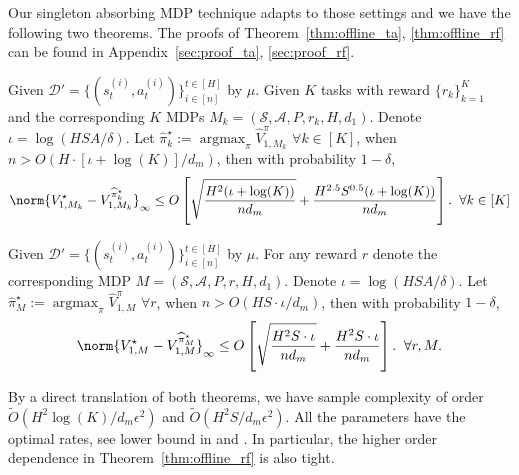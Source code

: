 Our singleton absorbing MDP technique adapts to those settings and we have the following two theorems. The proofs of Theorem~\ref{thm:offline_ta}, \ref{thm:offline_rf} can be found in Appendix~\ref{sec:proof_ta}, \ref{sec:proof_rf}.
\vspace{1em}
 \begin{theorem}\label{thm:offline_ta}
 	Given $\mathcal{D}'=\{(s_{t}^{(i)}, a_{t}^{(i)})\}_{i \in[n]}^{t \in[H]}$ by $\mu$. Given $K$ tasks with reward $\{r_k\}_{k=1}^K$ and the corresponding $K$ MDPs $M_k=(\mathcal{S}, \mathcal{A}, P, r_k, H, d_1)$. Denote $\iota=\log(HSA/\delta)$. Let $\widehat{\pi}_k^{\star}:=\operatorname{argmax}_{\pi} \widehat{V}_{1,M_k}^{\pi}$ $\forall k\in[K]$, when $n>O(H\cdot[\iota+\log(K)]/d_m)$, then with probability $1-\delta$,
 	\[
 	\norm{V_{1,M_k}^\star-V_{1,M_k}^{\widehat{\pi}_k^{\star}}}_\infty\leq 
 	O\left[\sqrt{\frac{H^2 (\iota+\log(K))}{n d_m}}+\frac{H^{2.5}S^{0.5}(\iota+\log(K))}{nd_m}\right].
 	\;\;\forall k\in[K]
 	\]
 \end{theorem}

\begin{theorem}\label{thm:offline_rf}
	Given $\mathcal{D}'=\{(s_{t}^{(i)}, a_{t}^{(i)})\}_{i \in[n]}^{t \in[H]}$ by $\mu$. For any reward $r$ denote the corresponding MDP $M=(\mathcal{S}, \mathcal{A}, P, r, H, d_1)$. Denote $\iota=\log(HSA/\delta)$. Let $\widehat{\pi}^{\star}_M:=\operatorname{argmax}_{\pi} \widehat{V}_{1,M}^{\pi}$ $\forall r$, when $n>O(HS\cdot\iota/d_m)$, then with probability $1-\delta$, 
	\[
	\norm{V_{1,M}^\star-V_{1,M}^{\widehat{\pi}^{\star}_M}}_\infty\leq O\left[\sqrt{\frac{H^2S \cdot\iota}{n d_m}}+\frac{H^{2}S\cdot\iota}{nd_m}\right].
	\;\;\forall r,M.
	\]
\end{theorem}

By a direct translation of both theorems, we have sample complexity of order $\widetilde{O}(H^2\log(K)/d_m\epsilon^2)$ and $\widetilde{O}(H^2S/d_m\epsilon^2)$. All the parameters have the optimal rates, see lower bound in \citet{zhang2020task} and \citet{jin2020reward}. In particular, the higher order dependence in Theorem~\ref{thm:offline_rf} is also tight. 





































